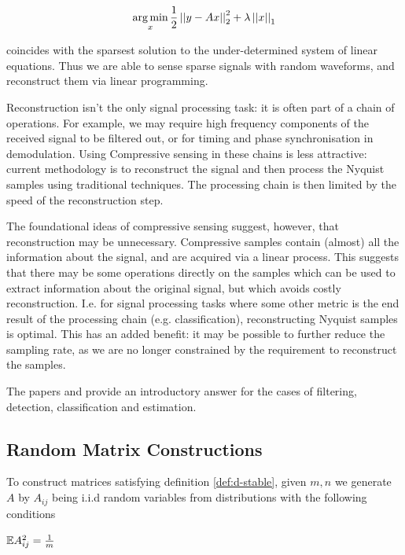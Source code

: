 \documentclass{article}
\begin{document}
\begin{equation}
\operatorname*{arg\,min}_{x} \frac{1}{2}\left|\left|y-Ax\right|\right|_2^2 + \lambda\left|\left|x\right|\right|_1
\end{equation}

coincides with the sparsest solution to the under-determined system of linear equations. Thus we are able to sense sparse signals with random waveforms, and reconstruct them via linear programming.

Reconstruction isn't the only signal processing task: it is often part of a chain of operations. For example, we may require high frequency components of the received signal to be filtered out, or for timing and phase synchronisation in demodulation. Using Compressive sensing in these chains is less attractive: current methodology is to reconstruct the signal and then process the Nyquist samples using traditional techniques. The processing chain is then limited by the speed of the reconstruction step. 

The foundational ideas of compressive sensing suggest, however, that reconstruction may be unnecessary. Compressive samples contain (almost) all the information about the signal, and are acquired via a linear process. This suggests that there may be some operations directly on the samples which can be used to extract information about the original signal, but which avoids costly reconstruction. I.e. for signal processing tasks where some other metric is the end result of the processing chain (e.g. classification), reconstructing Nyquist samples is optimal. This has an added benefit: it may be possible to further reduce the sampling rate, as we are no longer constrained by the requirement to reconstruct the samples.

The papers \cite{davenport2010signal} and \cite{davenport2007smashed} provide an introductory answer for the cases of filtering, detection, classification and estimation.


\subsection{Random Matrix Constructions} \label{sec:mtx-contruction}

To construct matrices satisfying definition \ref{def:d-stable}, given \(m, n\) we generate \(A\) by \(A_{ij}\) being i.i.d random variables from distributions with the following conditions \cite{davenport2010signal}

\begin{condition}
\({\mathbb{E}} A_{ij}^2 = \frac{1}{m}\)
\label{cond:norm-pres}
\end{condition}
\end{document}
